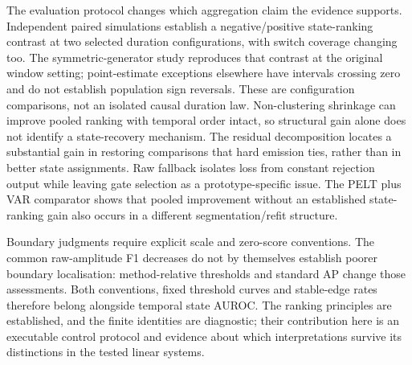 The evaluation protocol changes which aggregation claim the evidence supports.
Independent paired simulations establish a negative/positive state-ranking
contrast at two selected duration configurations, with switch coverage changing
too. The symmetric-generator study reproduces that contrast at the original
window setting; point-estimate exceptions elsewhere have intervals crossing
zero and do not establish population sign reversals. These are configuration
comparisons, not an isolated causal duration law.
Non-clustering shrinkage can improve pooled ranking with temporal order intact,
so structural gain alone does not identify a state-recovery mechanism.
The residual decomposition locates a substantial gain in restoring comparisons
that hard emission ties, rather than in better state assignments.
Raw fallback isolates loss from constant rejection output while leaving gate
selection as a prototype-specific issue. The PELT plus VAR comparator shows
that pooled improvement without an established state-ranking gain also occurs
in a different segmentation/refit structure.

Boundary judgments require explicit scale and zero-score conventions. The
common raw-amplitude F1 decreases do not by themselves establish poorer
boundary localisation: method-relative thresholds and standard AP change those
assessments. Both conventions, fixed threshold curves and stable-edge rates
therefore belong alongside temporal state AUROC. The ranking principles are
established, and the finite identities are diagnostic; their contribution here
is an executable control protocol and evidence about which interpretations
survive its distinctions in the tested linear systems.
